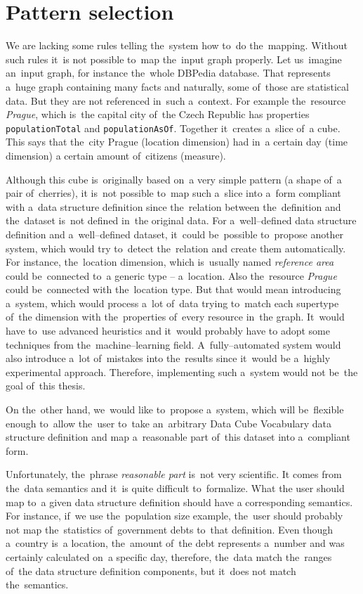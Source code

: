 \section{Pattern selection}
We are lacking some rules telling the~system how to~do the~mapping. 
Without such rules it~is not possible to~map the~input graph properly. Let us~imagine an~input graph, for instance the~whole DBPedia database. That represents a~huge graph 
containing many facts and naturally, some of~those are statistical data. But they 
are not referenced in~such a~context. For example the~resource \emph{Prague}, which is~the 
capital city of~the Czech Republic has properties \texttt{populationTotal} and
\texttt{populationAsOf}. Together it~creates a~slice of~a cube. This says that the~city Prague (location dimension) had in~a certain day (time dimension) 
a certain amount of~citizens (measure).

Although this cube is~originally based on~a very simple pattern (a shape of~a pair of~cherries),
it is~not possible to~map such a~slice into a~form compliant with a~data structure definition since the~relation between the~definition and the~dataset is~not defined in~the original data. For a~well--defined data structure 
definition and a~well--defined dataset, it~could be~possible to~propose another 
system, which would try to~detect the~relation and create them 
automatically. For instance, the~location dimension, which is~usually named
\emph{reference area} could be~connected to~a generic type -- a~location.
Also the~resource \emph{Prague} could be~connected with the~location type. But 
that would mean introducing a~system, which would process a~lot of~data trying to~match each supertype of~the dimension with the~properties of~every resource in~the graph. It~would have to~use advanced heuristics and it~would probably have 
to adopt some techniques from the~machine--learning field. A~fully--automated 
system would also introduce a~lot of~mistakes into the~results since it~would 
be a~highly experimental approach. Therefore, implementing such a~system would 
not be~the goal of~this thesis. 

On the~other hand, we~would like to~propose a~system, which will be~flexible 
enough to~allow the~user to~take an~arbitrary Data Cube Vocabulary data 
structure definition and map a~reasonable part of~this dataset into a~compliant 
form.

Unfortunately, the~phrase \emph{reasonable part} is~not very scientific. 
It comes from the~data semantics and it~is quite difficult to~formalize. What 
the user should map to~a given data structure definition should have 
a corresponding semantics. For instance, if~we use the~population size example, the~user should probably not map the~statistics of~government debts to~that 
definition. Even though a~country is~a location, the~amount of~the debt represents a~number and was certainly calculated on~a specific day, therefore, the~data match the~ranges of~the data structure definition components, but it~does 
not match the~semantics.

